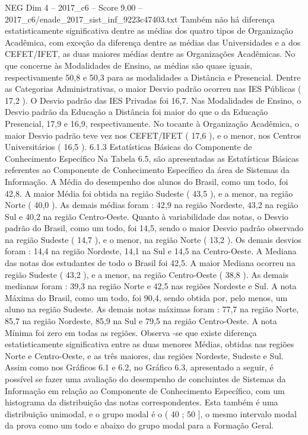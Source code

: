 \begin{textsample}{NEG Dim 4 – 2017\_c6 – Score 9.00 – 2017\_c6/enade\_2017\_sist\_inf\_9223c47403.txt}
Também não há diferença estatisticamente significativa dentre as médias dos quatro tipos de Organização Acadêmica, com exceção da diferença dentre as médias das Universidades e a dos CEFET/IFET, as duas maiores médias dentre as Organizações Acadêmicas.
No que concerne às Modalidades de Ensino, as médias são quase iguais, respectivamente 50,8 e 50,3 para as modalidades a Distância e Presencial.
Dentre as Categorias Administrativas, o maior Desvio padrão ocorreu nas IES Públicas ( 17,2 ).
O Desvio padrão das IES Privadas foi 16,7.
Nas Modalidades de Ensino, o Desvio padrão da Educação a Distância foi maior do que o da Educação Presencial, 17,9 e 16,9, respectivamente.
No tocante à Organização Acadêmica, o maior Desvio padrão teve vez nos CEFET/IFET ( 17,6 ), e o menor, nos Centros Universitários ( 16,5 ). 6.1.3 Estatísticas Básicas do Componente de Conhecimento Específico Na Tabela 6.5, são apresentadas as Estatísticas Básicas referentes ao Componente de Conhecimento Específico da área de Sistemas da Informação.
A Média do desempenho dos alunos do Brasil, como um todo, foi 42,8.
A maior Média foi obtida na região Sudeste ( 43,5 ), e a menor, na região Norte ( 40,0 ).
As demais médias foram : 42,9 na região Nordeste, 43,2 na região Sul e 40,2 na região Centro-Oeste.
Quanto à variabilidade das notas, o Desvio padrão do Brasil, como um todo, foi 14,5, sendo o maior Desvio padrão observado na região Sudeste ( 14,7 ), e o menor, na região Norte ( 13,2 ).
Os demais desvios foram : 14,4 na região Nordeste, 14,1 na Sul e 14,5 na Centro-Oeste.
A Mediana das notas dos estudantes de todo o Brasil foi 42,5.
A maior Mediana ocorreu na região Sudeste ( 43,2 ), e a menor, na região Centro-Oeste ( 38,8 ).
As demais medianas foram : 39,3 na região Norte e 42,5 nas regiões Nordeste e Sul.
A nota Máxima do Brasil, como um todo, foi 90,4, sendo obtida por, pelo menos, um aluno na região Sudeste.
As demais notas máximas foram : 77,7 na região Norte, 85,7 na região Nordeste, 85,9 na Sul e 79,5 na região Centro-Oeste.
A nota Mínima foi zero em todas as regiões.
Observa -se que existe diferença estatisticamente significativa entre as duas menores Médias, obtidas nas regiões Norte e Centro-Oeste, e as três maiores, das regiões Nordeste, Sudeste e Sul.
Assim como nos Gráficos 6.1 e 6.2, no Gráfico 6.3, apresentado a seguir, é possível se fazer uma avaliação do desempenho de concluintes de Sistemas da Informação em relação ao Componente de Conhecimento Específico, com um histograma da distribuição das notas correspondentes.
Esta também é uma distribuição unimodal, e o grupo modal é o ( 40 ; 50 ], o mesmo intervalo modal da prova como um todo e abaixo do grupo modal para a Formação Geral.

\end{textsample}
